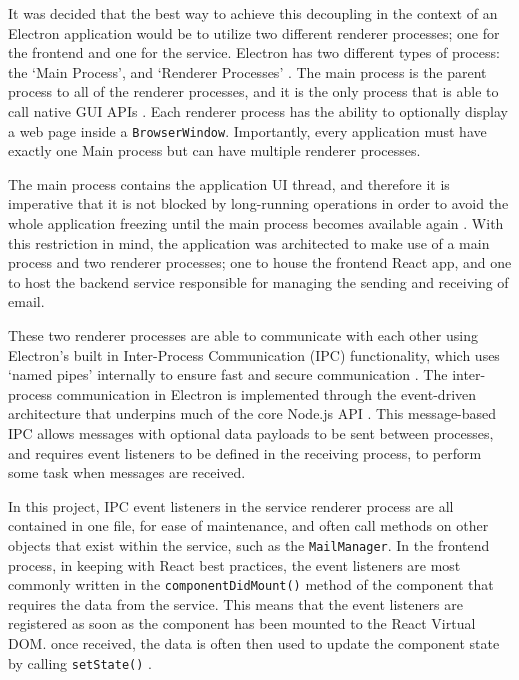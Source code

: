 It was decided that the best way to achieve this decoupling in the context of an Electron application would be to utilize two different renderer processes; one for the frontend and one for the service. Electron has two different types of process: the `Main Process', and `Renderer Processes' \cite{electron-architecture}. The main process is the parent process to all of the renderer processes, and it is the only process that is able to call native GUI APIs \cite{electron-architecture}. Each renderer process has the ability to optionally display a web page inside a \verb|BrowserWindow|. Importantly, every application must have exactly one Main process but can have multiple renderer processes.

The main process contains the application UI thread, and therefore it is imperative that it is not blocked by long-running operations in order to avoid the whole application freezing until the main process becomes available again \cite{electron-performance}. With this restriction in mind, the application was architected to make use of a main process and two renderer processes; one to house the frontend React app, and one to host the backend service responsible for managing the sending and receiving of email.

These two renderer processes are able to communicate with each other using Electron's built in Inter-Process Communication (IPC) functionality, which uses `named pipes' internally to ensure fast and secure communication \cite{chromium-ipc}. The inter-process communication in Electron is implemented through the event-driven architecture that underpins much of the core Node.js API \cite{node-events}. This message-based IPC allows messages with optional data payloads to be sent between processes, and requires event listeners to be defined in the receiving process, to perform some task when messages are received.

In this project, IPC event listeners in the service renderer process are all contained in one file, for ease of maintenance, and often call methods on other objects that exist within the service, such as the \verb|MailManager|. In the frontend process, in keeping with React best practices, the event listeners are most commonly written in the \verb|componentDidMount()| method \cite{react-components} of the component that requires the data from the service. This means that the event listeners are registered as soon as the component has been mounted to the React Virtual DOM. once received, the data is often then used to update the component state by calling \verb|setState()| \cite{react-state}.

